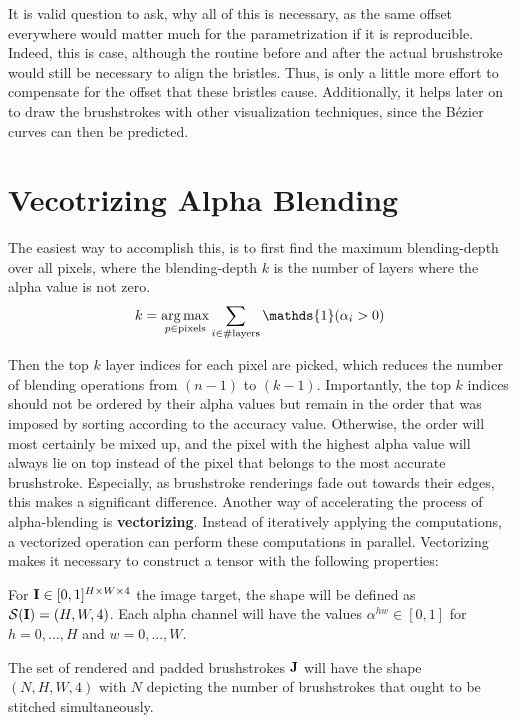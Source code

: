 It is valid question to ask, why all of this is necessary, as the same offset everywhere would matter much for the parametrization if it is reproducible.\\
Indeed, this is case, although the routine before and after the actual brushstroke would still be necessary to align the bristles.
Thus, is only a little more effort to compensate for the offset that these bristles cause.
Additionally, it helps later on to draw the brushstrokes with other visualization techniques, since the Bézier curves can then be predicted.

\section{Vecotrizing Alpha Blending}

The easiest way to accomplish this, is to first find the maximum blending-depth over all pixels, where the blending-depth $k$ is the number of layers where the alpha value is not zero.
\begin{align}
    k = \argmax_{p \in \text{pixels}} \sum_{i \in \# \text{layers}} \mathds{1}(\alpha_i > 0)
\end{align}

Then the top $k$ layer indices for each pixel are picked, which reduces the number of blending operations from $(n-1)$ to $(k-1)$.
Importantly, the top $k$ indices should not be ordered by their alpha values but remain in the order that was imposed by sorting according to the accuracy value.
Otherwise, the order will most certainly be mixed up, and the pixel with the highest alpha value will always lie on top instead of the pixel that belongs to the most accurate brushstroke.
Especially, as brushstroke renderings fade out towards their edges, this makes a significant difference.
Another way of accelerating the process of alpha-blending is \textbf{vectorizing}.
Instead of iteratively applying the computations, a vectorized operation can perform these computations in parallel.
Vectorizing makes it necessary to construct a tensor with the following properties:

For $\mathbf{I} \in [0, 1]^{H \times W \times 4} $ the image target, the shape will be defined
as $\mathcal{S}(\mathbf{I}) = (H, W, 4)$.
Each alpha channel will have the values $\alpha^{hw} \in [0, 1]$ for $h = 0, ..., H$ and $w = 0, ..., W$.

The set of rendered and padded brushstrokes $\mathbf{J}$ will have the shape $(N, H, W, 4)$ with $N$ depicting the number of brushstrokes that ought to be stitched simultaneously.

